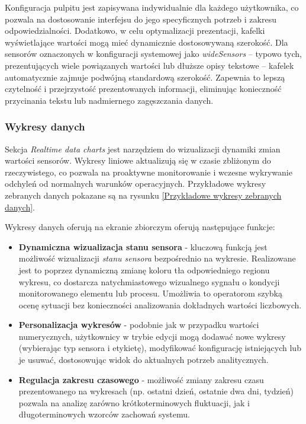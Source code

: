 \vspace{0.3em}
Konfiguracja pulpitu jest zapisywana indywidualnie dla każdego użytkownika, co pozwala na dostosowanie interfejsu do jego specyficznych potrzeb i zakresu odpowiedzialności. Dodatkowo, w celu optymalizacji prezentacji, kafelki wyświetlające wartości mogą mieć dynamicznie dostosowywaną szerokość. Dla sensorów oznaczonych w konfiguracji systemowej jako \textit{wideSensors} – typowo tych, prezentujących wiele powiązanych wartości lub dłuższe opisy tekstowe – kafelek automatycznie zajmuje podwójną standardową szerokość. Zapewnia to lepszą czytelność i przejrzystość prezentowanych informacji, eliminując konieczność przycinania tekstu lub nadmiernego zagęszczania danych.

\subsubsection{Wykresy danych}
Sekcja \textit{Realtime data charts} jest narzędziem do wizualizacji dynamiki zmian wartości sensorów. Wykresy liniowe aktualizują się w czasie zbliżonym do rzeczywistego, co pozwala na proaktywne monitorowanie i wczesne wykrywanie odchyleń od normalnych warunków operacyjnych. Przykładowe wykresy zebranych danych pokazane są na rysunku \ref{Przykładowe wykresy zebranych danych}.

\vspace{0.3em}

Wykresy danych oferują na ekranie zbiorczym oferują następujące funkcje:

\begin{itemize}
    \item \textbf{Dynamiczna wizualizacja stanu sensora} - kluczową funkcją jest możliwość wizualizacji \textit{stanu sensora} bezpośrednio na wykresie. Realizowane jest to poprzez dynamiczną zmianę koloru tła odpowiedniego regionu wykresu, co dostarcza natychmiastowego wizualnego sygnału o kondycji monitorowanego elementu lub procesu. Umożliwia to operatorom szybką ocenę sytuacji bez konieczności analizowania dokładnych wartości liczbowych.
    \item \textbf{Personalizacja wykresów} - podobnie jak w przypadku wartości numerycznych, użytkownicy w trybie edycji mogą dodawać nowe wykresy (wybierając typ sensora i etykietę), modyfikować konfigurację istniejących lub je usuwać, dostosowując widok do aktualnych potrzeb analitycznych.
    \item \textbf{Regulacja zakresu czasowego} - możliwość zmiany zakresu czasu prezentowanego na wykresach (np. ostatni dzień, ostatnie dwa dni, tydzień) pozwala na analizę zarówno krótkoterminowych fluktuacji, jak i długoterminowych wzorców zachowań systemu.
\end{itemize}

